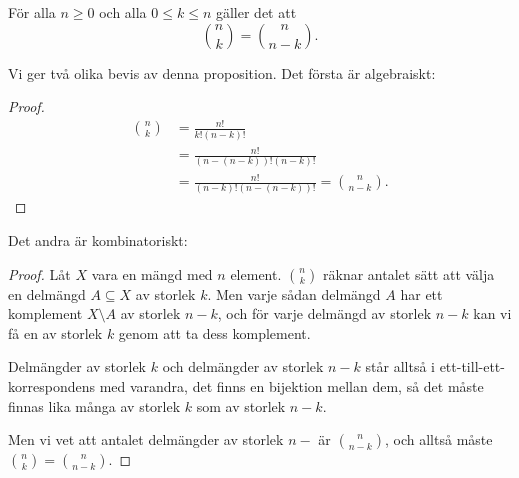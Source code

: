\documentclass{tufte-handout}
\begin{document}
\begin{proposition}
	För alla $n \geq 0$ och alla $0 \leq k \leq n$ gäller det att
	$$\binom{n}{k} = \binom{n}{n-k}.$$
\end{proposition}

Vi ger två olika bevis av denna proposition. Det första är algebraiskt:
\begin{proof}
	\begin{align*}
		\binom{n}{k} &= \frac{n!}{k!(n-k)!}\\
		&= \frac{n!}{(n-(n-k))!(n-k)!}\\
		&= \frac{n!}{(n-k)!(n-(n-k))!} = \binom{n}{n-k}.
	\end{align*}
\end{proof}

Det andra är kombinatoriskt:
\begin{proof}
	Låt $X$ vara en mängd med $n$ element. $\binom{n}{k}$ räknar antalet sätt att välja en delmängd $A \subseteq X$ av storlek $k$. Men varje sådan delmängd $A$ har ett komplement $X\setminus A$ av storlek $n-k$, och för varje delmängd av storlek $n-k$ kan vi få en av storlek $k$ genom att ta dess komplement.

	Delmängder av storlek $k$ och delmängder av storlek $n-k$ står alltså i ett-till-ett-korrespondens med varandra, det finns en bijektion mellan dem, så det måste finnas lika många av storlek $k$ som av storlek $n-k$.

	Men vi vet att antalet delmängder av storlek $n-$ är $\binom{n}{n-k}$, och alltså måste $\binom{n}{k} = \binom{n}{n-k}$.

\end{proof}
\end{document}
